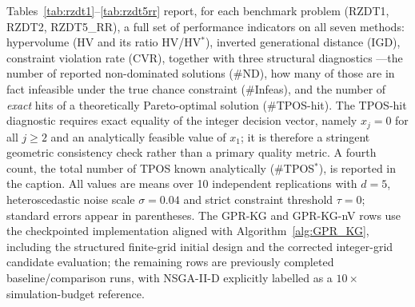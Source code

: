 \documentclass[12pt]{article}
\theoremstyle{plain}
\theoremstyle{definition}
\theoremstyle{remark}
\begin{document}
Tables~\ref{tab:rzdt1}--\ref{tab:rzdt5rr} report, for each benchmark
problem (RZDT1, RZDT2, RZDT5\_RR), a full set of performance
indicators on all seven methods: hypervolume (HV and its ratio
HV/HV$^*$), inverted generational distance (IGD), constraint violation
rate (CVR), together with three structural diagnostics ---the number of
reported non-dominated solutions ($\#$ND), how many of those are in
fact infeasible under the true chance constraint ($\#$Infeas), and the
number of \emph{exact} hits of a theoretically Pareto-optimal solution
($\#$TPOS-hit).  The TPOS-hit diagnostic requires exact equality of the
integer decision vector, namely $x_j=0$ for all $j\ge2$ and an
analytically feasible value of $x_1$; it is therefore a stringent
geometric consistency check rather than a primary quality metric.  A
fourth count, the total number of TPOS known analytically
($\#$TPOS$^*$), is reported in the caption.  All values
are means over 10 independent replications with $d=5$,
heteroscedastic noise scale $\sigma=0.04$ and strict constraint
threshold $\tau=0$; standard errors appear in parentheses.  The
GPR-KG and GPR-KG-nV rows use the checkpointed implementation aligned
with Algorithm~\ref{alg:GPR_KG}, including the structured finite-grid
initial design and the corrected integer-grid candidate evaluation; the
remaining rows are previously completed baseline/comparison runs, with
NSGA-II-D explicitly labelled as a $10\times$ simulation-budget
reference.
\end{document}
